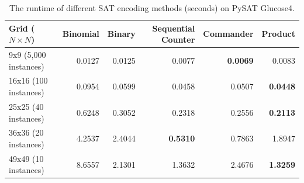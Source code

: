 \documentclass[a4paper,fleqn]{cas-sc}
\begin{document}
\begin{table}[t]
\centering
\caption{The runtime of different SAT encoding methods (seconds) on PySAT Glucose4.}
\label{tab:sat_runtime_comparison}
\begin{tabular}{lrrrrr}
\toprule
\textbf{Grid ($N \times N$)} & \textbf{Binomial} & \textbf{Binary} & \textbf{Sequential Counter} & \textbf{Commander} & \textbf{Product} \\
\midrule
9x9 (5,000 instances)   & 0.0127 & 0.0125 & 0.0077 & \textbf{0.0069} & 0.0083 \\
16x16 (100 instances)   & 0.0954 & 0.0599 & 0.0458 & 0.0507 & \textbf{0.0448} \\
25x25 (40 instances)    & 0.6248 & 0.3052 & 0.2318 & 0.2556 & \textbf{0.2113} \\
36x36 (20 instances)    & 4.2537 & 2.4044 & \textbf{0.5310} & 0.7863 & 1.8947 \\
49x49 (10 instances)    & 8.6557 & 2.1301 & 1.3632 & 2.4676 & \textbf{1.3259} \\
\bottomrule
\end{tabular}
\end{table}
\end{document}
